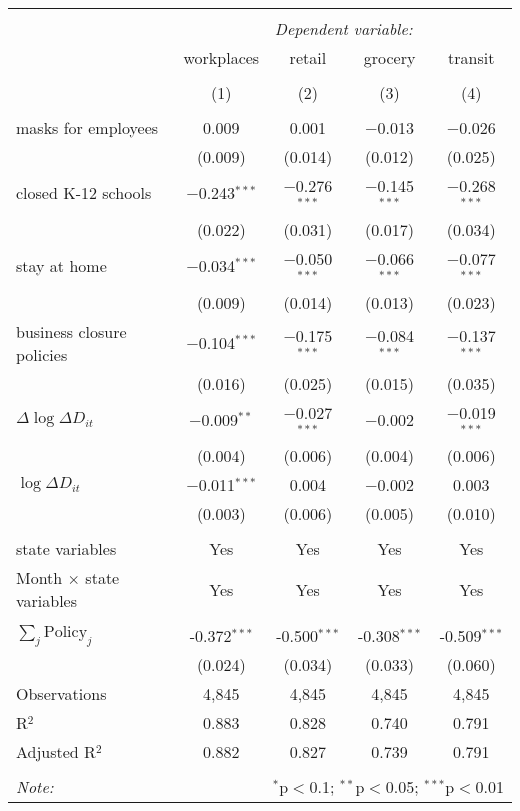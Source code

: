 \begin{tabular}{@{\extracolsep{1pt}}lcccc} 
\\[-1.8ex]\hline 
\hline \\[-1.8ex] 
 & \multicolumn{4}{c}{\textit{Dependent variable:}} \\ 
\cline{2-5} 
 & workplaces & retail & grocery & transit \\ 
\\[-1.8ex] & (1) & (2) & (3) & (4)\\ 
\hline \\[-1.8ex] 
 masks for employees & 0.009 & 0.001 & $-$0.013 & $-$0.026 \\ 
  & (0.009) & (0.014) & (0.012) & (0.025) \\ 
  closed K-12 schools & $-$0.243$^{***}$ & $-$0.276$^{***}$ & $-$0.145$^{***}$ & $-$0.268$^{***}$ \\ 
  & (0.022) & (0.031) & (0.017) & (0.034) \\ 
  stay at home & $-$0.034$^{***}$ & $-$0.050$^{***}$ & $-$0.066$^{***}$ & $-$0.077$^{***}$ \\ 
  & (0.009) & (0.014) & (0.013) & (0.023) \\ 
  business closure policies & $-$0.104$^{***}$ & $-$0.175$^{***}$ & $-$0.084$^{***}$ & $-$0.137$^{***}$ \\ 
  & (0.016) & (0.025) & (0.015) & (0.035) \\ 
  $\Delta \log \Delta D_{it}$ & $-$0.009$^{**}$ & $-$0.027$^{***}$ & $-$0.002 & $-$0.019$^{***}$ \\ 
  & (0.004) & (0.006) & (0.004) & (0.006) \\ 
  $\log \Delta D_{it}$ & $-$0.011$^{***}$ & 0.004 & $-$0.002 & 0.003 \\ 
  & (0.003) & (0.006) & (0.005) & (0.010) \\ 
 \hline \\[-1.8ex] 
state variables & Yes & Yes & Yes & Yes \\ 
Month $\times$ state variables & Yes & Yes & Yes & Yes \\ 
\hline \\[-1.8ex] 
$\sum_j \mathrm{Policy}_j$ & -0.372$^{***}$ & -0.500$^{***}$ & -0.308$^{***}$ & -0.509$^{***}$ \\ 
 & (0.024) & (0.034) & (0.033) & (0.060) \\ 
Observations & 4,845 & 4,845 & 4,845 & 4,845 \\ 
R$^{2}$ & 0.883 & 0.828 & 0.740 & 0.791 \\ 
Adjusted R$^{2}$ & 0.882 & 0.827 & 0.739 & 0.791 \\ 
\hline 
\hline \\[-1.8ex] 
\textit{Note:}  & \multicolumn{4}{r}{$^{*}$p$<$0.1; $^{**}$p$<$0.05; $^{***}$p$<$0.01} \\ 
\end{tabular} 